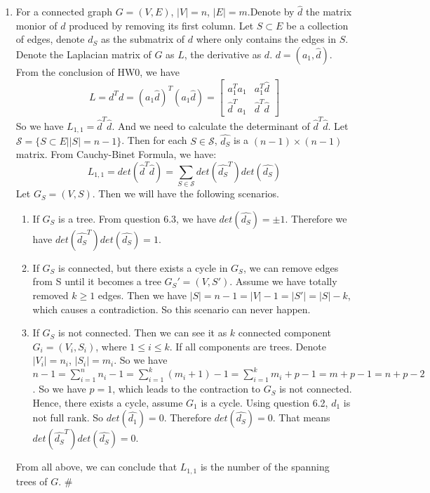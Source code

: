 \documentclass[twoside,11pt]{homework}
\begin{document}
\begin{enumerate}
    \item
    For a connected graph $G = (V,E)$, $|V|=n$, $|E| = m$.Denote by $\hat{d}$ the matrix monior of $d$ produced by removing its first column. Let $S \subset E$ be a collection of edges, denote $d_S$ as the submatrix of $d$ where only contains the edges in $S$. Denote the Laplacian matrix of $G$ as $L$, the derivative as $d$. $ d= (a_1, \hat{d})$. From the conclusion of HW0, we have $$L = d^Td = (a_1 \hat{d})^T (a_1 \hat{d}) = \left[
    \begin{matrix}
    a_1^Ta_1 & a_1^T \hat{d} \\
    \hat{d}^T a_1& \hat{d}^T \hat{d} 
    \end{matrix}
    \right]$$
    So we have $L_{1,1} = \hat{d}^T \hat{d}$. And we need to calculate the determinant of $\hat{d}^T \hat{d}$.
    Let $\mathcal{S} = \{S \subset E | |S|=n-1\}$. Then for each $S \in \mathcal{S}$, $\hat{d_S}$ is a $(n-1)\times(n-1)$ matrix. From Cauchy-Binet Formula, we have:
    $$L_{1,1} = det(\hat{d}^T \hat{d}) = \sum_{S \in \mathcal{S}} det(\hat{d_S}^T) det(\hat{d_S})$$
    Let $G_S = (V, S)$. Then we will have the following scenarios.
    \begin{enumerate}
        \item 
        If $G_S$ is a tree. From question 6.3, we have $det(\hat{d_S})=\pm 1$. Therefore we have $det(\hat{d_S}^T) det(\hat{d_S})=1$.
        \item
        If $G_S$ is connected, but there exists a cycle in $G_S$, we can remove edges from S until it becomes a tree $G_S' = (V, S')$. Assume we have totally removed $k \geq 1$ edges. Then we have $|S| = n-1 = |V|-1 = |S'| = |S|-k$, which causes a contradiction. So this scenario can never happen.
        \item
        If $G_S$ is not connected. Then we can see it as $k$ connected component $G_i = (V_i, S_i)$, where $1 \leq i \leq k$. If all components are trees.  Denote $|V_i|=n_i$, $|S_i|=m_i$. So we have $n-1=\sum_{i=1}^n n_i-1 = \sum_{i=1}^k (m_i+1)-1 = \sum _{i=1}^k m_i+p-1 = m+p-1 = n+p-2$. So we have $p=1$, which leads to the contraction to $G_S$ is not connected. Hence, there exists a cycle, assume $G_1$ is a cycle. Using question 6.2, $d_1$ is not full rank. So $det(\hat{d_1})=0$. Therefore $det(\hat{d_S})=0$. That means $det(\hat{d_S}^T) det(\hat{d_S})=0$.
    \end{enumerate}
    From all above, we can conclude that $L_{1,1}$ is the number of the spanning trees of $G$. \#
     
    
    
    
\end{enumerate}
\end{document}
